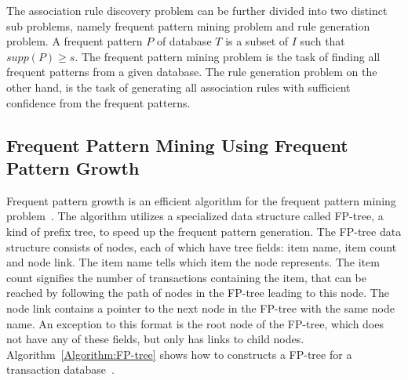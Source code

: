 The association rule discovery problem can be further divided into two distinct sub problems, namely frequent pattern mining problem and rule generation problem. A frequent pattern $P$ of database $T$ is a subset of $I$ such that $supp(P) \geq s$. The frequent pattern mining problem is the task of finding all frequent patterns from a given database. The rule generation problem on the other hand, is the task of generating all association rules with sufficient confidence from the frequent patterns. 

\subsection{Frequent Pattern Mining Using Frequent Pattern Growth}

Frequent pattern growth is an efficient algorithm for the frequent pattern mining problem~\cite{Han:2000:MFP:335191.335372}. The algorithm utilizes a specialized data structure called FP-tree, a kind of prefix tree, to speed up the frequent pattern generation. The FP-tree data structure consists of nodes, each of which have tree fields: item name, item count and node link. The item name tells which item the node represents. The item count signifies the number of transactions containing the item, that can be reached by following the path of nodes in the FP-tree leading to this node. The node link contains a pointer to the next node in the FP-tree with the same node name. An exception to this format is the root node of the FP-tree, which does not have any of these fields, but only has links to child nodes. Algorithm~\ref{Algorithm:FP-tree} shows how to constructs a FP-tree for a transaction database~\cite{Han:2000:MFP:335191.335372}.

